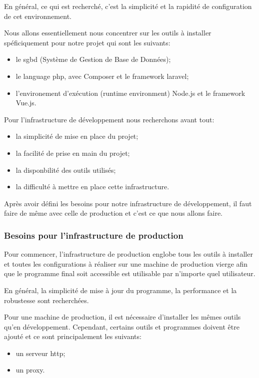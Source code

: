 \documentclass[
    iai, %
    il, %
]{heig-tb}
\begin{document}
En général, ce qui est recherché, c'est la simplicité et la rapidité de configuration de cet environnement.

Nous allons essentiellement nous concentrer sur les outils à installer spéficiquement pour notre projet qui sont les suivants:
\begin{itemize}
    \item le \Gls{sgbd} (Système de Gestion de Base de Données);
    \item le language \Gls{php}, avec Composer et le \Gls{framework} \Gls{laravel};
    \item l'environement d'exécution (runtime environment) Node.js et le \Gls{framework} Vue.js.
\end{itemize}

Pour l'infrastructure de développement nous recherchons avant tout:
\begin{itemize}
    \item la simplicité de mise en place du projet;
    \item la facilité de prise en main du projet;
    \item la disponbilité des outils utilisés;
    \item la difficulté à mettre en place cette infrastructure.
\end{itemize}

Après avoir défini les besoins pour notre infrastructure de développement, il faut faire de même avec celle de production et c'est ce que nous allons faire.

\newpage

\subsubsection{Besoins pour l'infrastructure de production}
Pour commencer, l'infrastructure de production englobe tous les outils à installer et toutes les configurations à réaliser sur une machine de production vierge afin que le programme final soit accessible est utilisable par n'importe quel utilisateur.

En général, la simplicité de mise à jour du programme, la performance et la robustesse sont recherchées.

Pour une machine de production, il est nécessaire d'installer les mêmes outils qu'en développement. Cependant, certains outils et programmes doivent être ajouté et ce sont principalement les suivants:
\begin{itemize}
    \item un serveur \Gls{http};
    \item un \Gls{proxy}.
\end{itemize}
\end{document}

